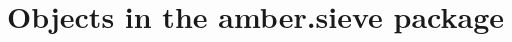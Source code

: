 \section{Objects in the amber.sieve package}


\begin{classmetadata}
\end{classmetadata}

\begin{interface}
\end{interface}




\begin{classmetadata}
\end{classmetadata}

\begin{interface}
\end{interface}

